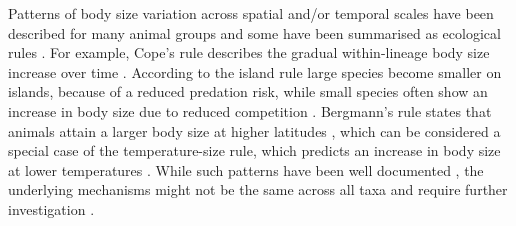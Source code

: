 Patterns of body size variation across spatial and/or temporal scales have been described for many animal groups and some have been summarised as ecological rules \citep{Millien2006,Angielczyk2015}.
For example, Cope's rule describes the gradual within-lineage body size increase over time \citep{Cope1887}. According to the island rule large species become smaller on islands, because of a reduced predation risk, while small species often show an increase in body size due to reduced competition \citep{Foster1964}. Bergmann's rule states that animals attain a larger body size at higher latitudes \citep{Bergmann1848}, which can be considered a special case of the temperature-size rule, which predicts an increase in body size at lower temperatures \citep{AngillettaJr2004a}.
While such patterns have been well documented
\citep{Millien2006}, the underlying mechanisms might not be the same across all taxa and require further investigation \citep{Smith2009}.





